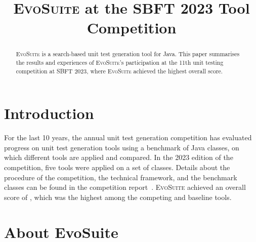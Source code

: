 \documentclass[10pt,conference]{IEEEtran}
\newcommand{\EVOSUITE}{\textsc{EvoSuite}\xspace}
\begin{document}
%

\title{\EVOSUITE at the SBFT 2023 Tool Competition}


\author{%
  \and
  \and
}

\maketitle

\begin{abstract}
  \EVOSUITE is a search-based unit test generation tool for Java. This paper summarises the results and experiences of \EVOSUITE's participation at the 11th unit testing competition at SBFT 2023, where \EVOSUITE achieved the highest overall score.
\end{abstract}


\section{Introduction}
%
For the last 10 years, the annual unit test generation competition has
evaluated progress on unit test generation tools using a benchmark of Java
classes, on which different tools are applied and compared. In the 2023 edition
of the competition, five tools were applied on a set of \cuts classes. Details
about the procedure of the competition, the technical framework, and the
benchmark classes can be found in the competition
report~\cite{SBST-toolcomp22}. \EVOSUITE achieved an overall score of \score,
which was the highest among the competing and baseline tools.


\section{About EvoSuite}
\end{document}
